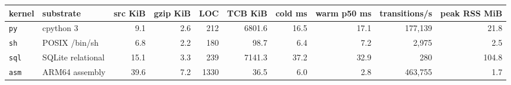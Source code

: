 \begin{tabular}{llrrrrrrrr}
\toprule
kernel & substrate & src KiB & gzip KiB & LOC & TCB KiB & cold ms & warm p50 ms & transitions/s & peak RSS MiB \\
\midrule
\texttt{py} & cpython 3 & 9.1 & 2.6 & 212 & 6801.6 & 16.5 & 17.1 & 177,139 & 21.8 \\
\texttt{sh} & POSIX /bin/sh & 6.8 & 2.2 & 180 & 98.7 & 6.4 & 7.2 & 2,975 & 2.5 \\
\texttt{sql} & SQLite relational & 15.1 & 3.3 & 239 & 7141.3 & 37.2 & 32.9 & 280 & 104.8 \\
\texttt{asm} & ARM64 assembly & 39.6 & 7.2 & 1330 & 36.5 & 6.0 & 2.8 & 463,755 & 1.7 \\
\bottomrule
\end{tabular}
